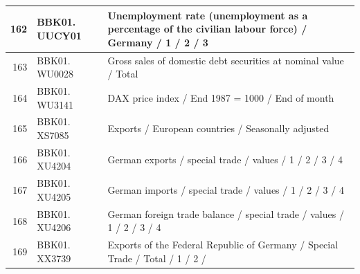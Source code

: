 \documentclass[12pt]{article}
\begin{document}
\begin{table}[ht]
\begin{tabular}{r|p{4cm}p{11cm}}
	\hline
	162 & BBK01. UUCY01 & Unemployment rate (unemployment as a percentage of the civilian labour force) / Germany / 1 / 2 / 3 \\ 
	\hline
	163 & BBK01. WU0028 & Gross sales of domestic debt securities at nominal value / Total \\ 
	\hline
	164 & BBK01. WU3141 & DAX price index / End 1987 = 1000 / End of month \\ 
	\hline
	165 & BBK01. XS7085 & Exports / European countries / Seasonally adjusted \\ 
	\hline
	166 & BBK01. XU4204 & German exports / special trade / values / 1 / 2 / 3 / 4 \\ 
	\hline
	167 & BBK01. XU4205 & German imports / special trade / values / 1 / 2 / 3 / 4 \\ 
	\hline
	168 & BBK01. XU4206 & German foreign trade balance / special trade / values / 1 / 2 / 3 / 4 \\ 
	\hline
	169 & BBK01. XX3739 & Exports of the Federal Republic of Germany / Special Trade / Total / 1 / 2 / \\ 
	\hline
    \hline
\end{tabular}
\end{table}




\clearpage
\newpage



\newpage
{}
\restoregeometry
\singlespacing
\end{document}
